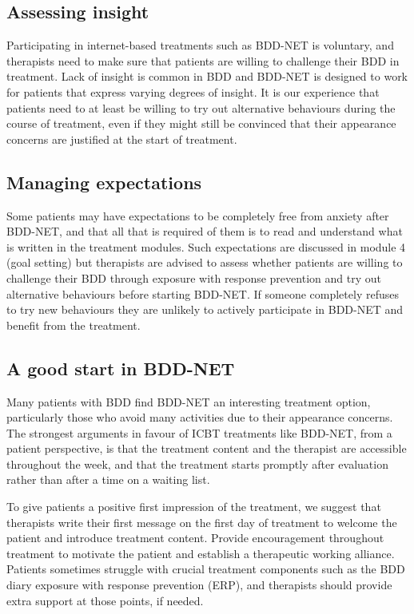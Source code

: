 \documentclass[]{book}
\begin{document}
\hypertarget{assessing-insight}{%
\subsection{Assessing insight}\label{assessing-insight}}

Participating in internet-based treatments such as BDD-NET is voluntary, and therapists need to make sure that patients are willing to challenge their BDD in treatment. Lack of insight is common in BDD and BDD-NET is designed to work for patients that express varying degrees of insight. It is our experience that patients need to at least be willing to try out alternative behaviours during the course of treatment, even if they might still be convinced that their appearance concerns are justified at the start of treatment.

\hypertarget{managing-expectations}{%
\subsection{Managing expectations}\label{managing-expectations}}

Some patients may have expectations to be completely free from anxiety after BDD-NET, and that all that is required of them is to read and understand what is written in the treatment modules. Such expectations are discussed in module 4 (goal setting) but therapists are advised to assess whether patients are willing to challenge their BDD through exposure with response prevention and try out alternative behaviours before starting BDD-NET. If someone completely refuses to try new behaviours they are unlikely to actively participate in BDD-NET and benefit from the treatment.

\hypertarget{a-good-start-in-bdd-net}{%
\subsection{A good start in BDD-NET}\label{a-good-start-in-bdd-net}}

Many patients with BDD find BDD-NET an interesting treatment option, particularly those who avoid many activities due to their appearance concerns. The strongest arguments in favour of ICBT treatments like BDD-NET, from a patient perspective, is that the treatment content and the therapist are accessible throughout the week, and that the treatment starts promptly after evaluation rather than after a time on a waiting list.

To give patients a positive first impression of the treatment, we suggest that therapists write their first message on the first day of treatment to welcome the patient and introduce treatment content. Provide encouragement throughout treatment to motivate the patient and establish a therapeutic working alliance. Patients sometimes struggle with crucial treatment components such as the BDD diary exposure with response prevention (ERP), and therapists should provide extra support at those points, if needed.
\end{document}

